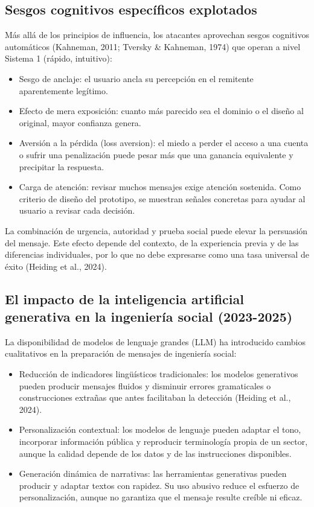 \documentclass[11pt,a4paper,oneside]{report}
\begin{document}
\subsection{Sesgos cognitivos específicos explotados}

Más allá de los principios de influencia, los atacantes aprovechan sesgos cognitivos automáticos (Kahneman, 2011; Tversky \& Kahneman, 1974) que operan a nivel Sistema 1 (rápido, intuitivo):

\begin{itemize}
  \item Sesgo de anclaje: el usuario ancla su percepción en el remitente aparentemente legítimo.
  \item Efecto de mera exposición: cuanto más parecido sea el dominio o el diseño al original, mayor confianza genera.
  \item Aversión a la pérdida (loss aversion): el miedo a perder el acceso a una cuenta o sufrir una penalización puede pesar más que una ganancia equivalente y precipitar la respuesta.
  \item Carga de atención: revisar muchos mensajes exige atención sostenida. Como criterio de diseño del prototipo, se muestran señales concretas para ayudar al usuario a revisar cada decisión.
\end{itemize}

La combinación de urgencia, autoridad y prueba social puede elevar la persuasión del mensaje. Este efecto depende del contexto, de la experiencia previa y de las diferencias individuales, por lo que no debe expresarse como una tasa universal de éxito (Heiding et al., 2024).

\subsection{El impacto de la inteligencia artificial generativa en la ingeniería social (2023-2025)}

La disponibilidad de modelos de lenguaje grandes (LLM) ha introducido cambios cualitativos en la preparación de mensajes de ingeniería social:

\begin{itemize}
  \item Reducción de indicadores lingüísticos tradicionales: los modelos generativos pueden producir mensajes fluidos y disminuir errores gramaticales o construcciones extrañas que antes facilitaban la detección (Heiding et al., 2024).
  \item Personalización contextual: los modelos de lenguaje pueden adaptar el tono, incorporar información pública y reproducir terminología propia de un sector, aunque la calidad depende de los datos y de las instrucciones disponibles.
  \item Generación dinámica de narrativas: las herramientas generativas pueden producir y adaptar textos con rapidez. Su uso abusivo reduce el esfuerzo de personalización, aunque no garantiza que el mensaje resulte creíble ni eficaz.
\end{itemize}
\end{document}
